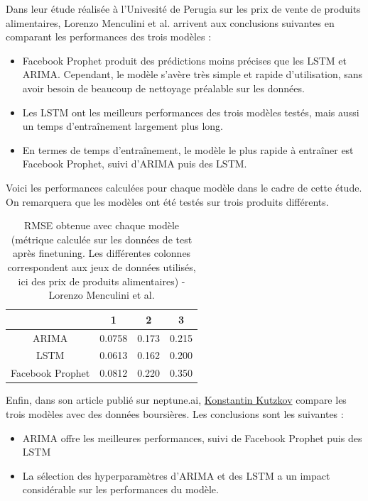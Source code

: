 \documentclass[french]{article}
\begin{document}
    Dans leur étude réalisée à l'Univesité de Perugia sur les prix de vente de produits alimentaires, Lorenzo Menculini et al.\cite{menculini} arrivent aux conclusions suivantes en comparant les performances des trois modèles :
    \begin{itemize}
        \item  Facebook Prophet produit des prédictions moins précises que les LSTM et ARIMA. Cependant, le modèle s'avère très simple et rapide d'utilisation, sans avoir besoin de beaucoup de nettoyage préalable sur les données.
        \item Les LSTM ont les meilleurs performances des trois modèles testés, mais aussi un temps d'entraînement largement plus long.
        \item En termes de temps d'entraînement, le modèle le plus rapide à entraîner est Facebook Prophet, suivi d'ARIMA puis des LSTM.
    \end{itemize}
    Voici les performances calculées pour chaque modèle dans le cadre de cette étude. On remarquera que les modèles ont été testés sur trois produits différents.
    \begin{table}[h!]
        \begin{center}
            \begin{tabular}{ |c| c| c| c| }
                \hline
                 & 1 & 2 & 3 \\
                \hline
                ARIMA & 0.0758 & 0.173 & 0.215 \\ 
                \hline
                LSTM & 0.0613 & 0.162 & 0.200 \\  
                \hline
                Facebook Prophet & 0.0812 & 0.220 & 0.350 \\
                \hline
            \end{tabular}
            \caption{RMSE obtenue avec chaque modèle (métrique calculée sur les données de test après finetuning. Les différentes colonnes correspondent aux jeux de données utilisés, ici des prix de produits alimentaires) - Lorenzo Menculini et al.}
            \label{table:1}
        \end{center}
    \end{table}
    
    Enfin, dans son article publié sur neptune.ai\cite{neptune}, \href{https://www.linkedin.com/in/konstantin-kutzkov-%F0%9F%87%BA%F0%9F%87%A6-10a98667/?originalSubdomain=bg}{Konstantin Kutzkov} compare les trois modèles avec des données boursières. Les conclusions sont les suivantes :
    \begin{itemize}
        \item ARIMA offre les meilleures performances, suivi de Facebook Prophet puis des LSTM
        \item La sélection des hyperparamètres d'ARIMA et des LSTM a un impact considérable sur les performances du modèle.
    \end{itemize}
\end{document}
